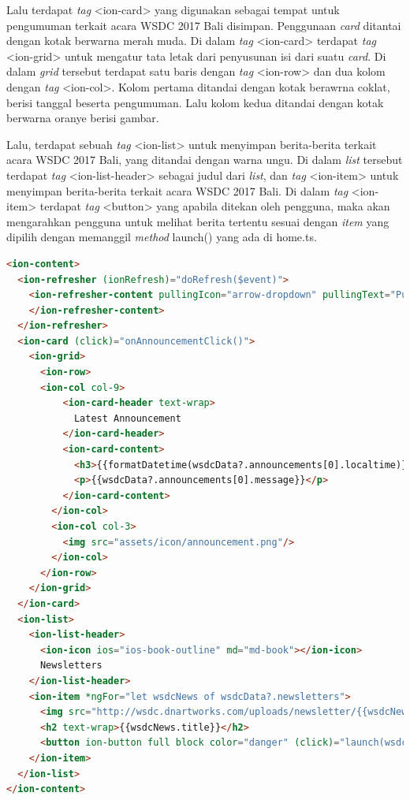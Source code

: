 \begin{itemize}
\begin{itemize}
		Lalu terdapat \textit{tag} <ion-card> yang digunakan sebagai tempat untuk pengumuman terkait acara WSDC 2017 Bali disimpan. Penggunaan \textit{card} ditantai dengan kotak berwarna merah muda. Di dalam \textit{tag} <ion-card> terdapat \textit{tag} <ion-grid> untuk mengatur tata letak dari penyusunan isi dari suatu \textit{card}. Di dalam \textit{grid} tersebut terdapat satu baris dengan \textit{tag} <ion-row> dan dua kolom dengan \textit{tag} <ion-col>. Kolom pertama ditandai dengan kotak berawrna coklat, berisi tanggal beserta pengumuman. Lalu kolom kedua ditandai dengan kotak berwarna oranye berisi gambar.
		
		Lalu, terdapat sebuah \textit{tag} <ion-list> untuk menyimpan berita-berita terkait acara WSDC 2017 Bali, yang ditandai dengan warna ungu. Di dalam \textit{list} tersebut terdapat \textit{tag} <ion-list-header> sebagai judul dari \textit{list}, dan \textit{tag} <ion-item> untuk menyimpan berita-berita terkait acara WSDC 2017 Bali. Di dalam \textit{tag} <ion-item> terdapat \textit{tag} <button> yang apabila ditekan oleh pengguna, maka akan mengarahkan pengguna untuk melihat berita tertentu sesuai dengan \textit{item} yang dipilih dengan memanggil \textit{method} launch() yang ada di home.ts. 

\newpage		
		
\begin{lstlisting}[language=html, label={lst:contentHome}, caption=\textit{Content} pada home.html]
<ion-content>
  <ion-refresher (ionRefresh)="doRefresh($event)">
    <ion-refresher-content pullingIcon="arrow-dropdown" pullingText="Pull to refresh" refreshingSpinner="circles" refreshingText="Refreshing...">
    </ion-refresher-content>
  </ion-refresher>
  <ion-card (click)="onAnnouncementClick()">
    <ion-grid>
      <ion-row>
      <ion-col col-9>
          <ion-card-header text-wrap>
            Latest Announcement
          </ion-card-header>
          <ion-card-content>
            <h3>{{formatDatetime(wsdcData?.announcements[0].localtime)}}</h3>
            <p>{{wsdcData?.announcements[0].message}}</p>
          </ion-card-content>
        </ion-col>
        <ion-col col-3>
          <img src="assets/icon/announcement.png"/>
        </ion-col>
      </ion-row>
    </ion-grid>
  </ion-card>
  <ion-list>
    <ion-list-header>
      <ion-icon ios="ios-book-outline" md="md-book"></ion-icon>
      Newsletters
    </ion-list-header>
    <ion-item *ngFor="let wsdcNews of wsdcData?.newsletters">
      <img src="http://wsdc.dnartworks.com/uploads/newsletter/{{wsdcNews.id}}/thumbnail.jpg" alt="{{wsdcNews.title}}">
      <h2 text-wrap>{{wsdcNews.title}}</h2>
      <button ion-button full block color="danger" (click)="launch(wsdcNews.url)">Read More</button>
    </ion-item>
  </ion-list>
</ion-content>
\end{lstlisting}
		

\end{itemize}
\end{itemize}
